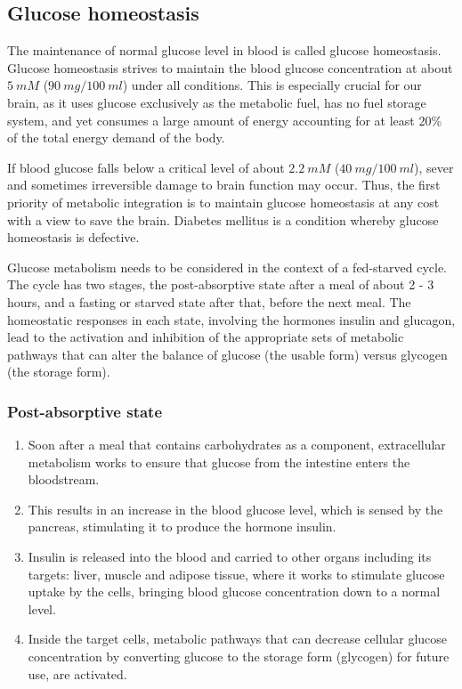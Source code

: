 \documentclass[11pt]{article}
\begin{document}
\subsection{Glucose homeostasis}
\label{sec:org6021b08}
The maintenance of normal glucose level in blood is called glucose homeostasis. Glucose homeostasis strives to maintain the blood glucose concentration at about \(\qty{5}{\unit{mM}}\) (\(\qty{90}{\unit{mg}} / \qty{100}{\unit{ml}}\)) under all conditions. This is especially crucial for our brain, as it uses glucose exclusively as the metabolic fuel, has no fuel storage system, and yet consumes a large amount of energy accounting for at least 20\% of the total energy demand of the body.


If blood glucose falls below a critical level of about \(\qty{2.2}{\unit{mM}}\) (\(\qty{40}{\unit{mg}} / \qty{100}{\unit{ml}}\)), sever and sometimes irreversible damage to brain function may occur. Thus, the first priority of metabolic integration is to maintain glucose homeostasis at any cost with a view to save the brain. Diabetes mellitus is a condition whereby glucose homeostasis is defective.


Glucose metabolism needs to be considered in the context of a fed-starved cycle. The cycle has two stages, the post-absorptive state after a meal of about 2 - 3 hours, and a fasting or starved state after that, before the next meal. The homeostatic responses in each state, involving the hormones insulin and glucagon, lead to the activation and inhibition of the appropriate sets of metabolic pathways that can alter the balance of glucose (the usable form) versus glycogen (the storage form).

\newpage
\subsubsection{Post-absorptive state}
\label{sec:org3641abe}
\begin{enumerate}
\item Soon after a meal that contains carbohydrates as a component, extracellular metabolism works to ensure that glucose from the intestine enters the bloodstream.
\item This results in an increase in the blood glucose level, which is sensed by the pancreas, stimulating it to produce the hormone insulin.
\item Insulin is released into the blood and carried to other organs including its targets: liver, muscle and adipose tissue, where it works to stimulate glucose uptake by the cells, bringing blood glucose concentration down to a normal level.
\item Inside the target cells, metabolic pathways that can decrease cellular glucose concentration by converting glucose to the storage form (glycogen) for future use, are activated.
\end{enumerate}
\end{document}
